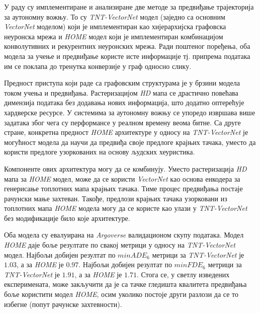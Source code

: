 \documentclass[11pt,oneside]{memoir}
\begin{document}
У раду су имплементиране и анализиране две методе за предвиђање трајекторија за аутономну вожњу. 
То су \textit{TNT-VectorNet} модел (заједно са основним \textit{VectorNet} моделом) који је имплементиран као хијерархијска графовска неуронска мрежа
и \textit{HOME} модел који је имплементиран комбинацијом конволутивних и рекурентних неуронских мрежа. Ради поштеног поређења, оба
модела за учење и предвиђање користе исте информације тј. припрема података им се поклапа до тренутка конверзије у граф односно слику.

Предност приступа који раде са графовским структурама је у брзини модела током учења и предвиђања. Растеризацијом \textit{HD} мапа 
се драстично повећава димензија података без додавања нових информација, што додатно оптерећује хардверске ресурсе. У системима за аутономну
вожњу се упоредо извршава више задатака због чега су перформансе у реалном времену веома битне. Са друге стране, конкретна предност
\textit{HOME} архитектуре у односу на \textit{TNT-VectorNet} је могућност модела да научи да предвиђа своје предлоге крајњих тачака,
уместо да користи предлоге узоркованих на основу људских хеуристика. 

Компоненте ових архитектура могу да се комбинују. Уместо растеризација \textit{HD} мапа за \textit{HOME} модел, може да се користи \textit{VectorNet}
као основа енкодера за генерисање топлотних мапа крајњих тачака. Тиме процес предвиђања постаје рачунски мање захтеван. Такође, предлози 
крајњих тачака узорковани из топлотних мапа \textit{HOME} модела могу да се користе као улази у \textit{TNT-VectorNet} без модификације
било које архитектуре.

Оба модела су евалуирана на \textit{Argoverse} валидационом скупу података. Модел \textit{HOME} даје боље резултате по свакој
метрици у односу на \textit{TNT-VectorNet} модел. Најбољи добијен резултат по $minADE_{6}$ метрици за \textit{TNT-VectorNet} је $1.03$, а за \textit{HOME}
је $0.97$. Најбољи добијен резултат по $minFDE_{6}$ метрици за \textit{TNT-VectorNet} је $1.91$, а за \textit{HOME} је $1.71$. Стога се, у светлу изведених експеримената, може закључити да
је са тачке гледишта квалитета предвиђања боље користити модел
\textit{HOME}, осим уколико постоје други разлози да се то избегне (попут
рачунске захтевности).

\backmatter
\end{document}
